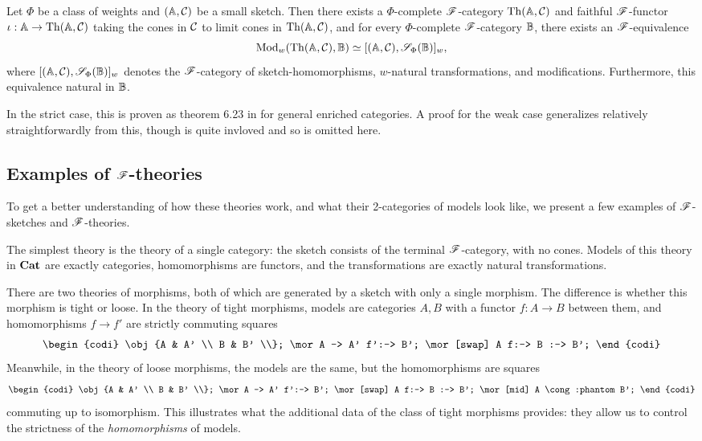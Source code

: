 \documentclass[../thesis.tex]{subfiles}
\begin{document}
\begin{theorem}
  Let $\Phi$ be a class of weights and $({\mathbb{A}},{\mathcal{C}})$ be a small sketch. Then there exists a $\Phi$-complete
  ${\mathscr{F}}$-category ${\mathrm{Th}}({\mathbb{A}},{\mathcal{C}})$ and faithful ${\mathscr{F}}$-functor $\iota : {\mathbb{A}} \to {\mathrm{Th}}({\mathbb{A}},{\mathcal{C}})$ taking the cones
  in ${\mathcal{C}}$ to limit cones in ${\mathrm{Th}}({\mathbb{A}},{\mathcal{C}})$, and for every $\Phi$-complete ${\mathscr{F}}$-category ${\mathbb{B}}$, there exists
  an ${\mathscr{F}}$-equivalence
  \[{\mathrm{Mod}}_w({\mathrm{Th}}({\mathbb{A}},{\mathcal{C}}),{\mathbb{B}}) \simeq [({\mathbb{A}},{\mathcal{C}}), {\mathscr{S}}_\Phi({\mathbb{B}})]_w,\]
  where $[({\mathbb{A}},{\mathcal{C}}), {\mathscr{S}}_\Phi({\mathbb{B}})]_w$ denotes the ${\mathscr{F}}$-category of sketch-homomorphisms, $w$-natural
  transformations, and modifications. Furthermore, this equivalence natural in ${\mathbb{B}}$.
\end{theorem}
\begin{remark}
  In the strict case, this is proven as theorem 6.23 in \cite{kelly1982a} for general enriched categories.
  A proof for the weak case generalizes relatively straightforwardly from this, though is quite invloved
  and so is omitted here.
\end{remark}


\subsection{Examples of \texorpdfstring{${\mathscr{F}}$}{F}-theories}
To get a better understanding of how these theories work, and what their 2-categories of models look like,
we present a few examples of ${\mathscr{F}}$-sketches and ${\mathscr{F}}$-theories.

\begin{example}
  The simplest theory is the theory of a single category: the sketch consists of the terminal
  ${\mathscr{F}}$-category, with no cones. Models of this theory in ${\mathbf{Cat}}$ are exactly categories,
  homomorphisms are functors, and the transformations are exactly natural transformations.
\end{example}

\begin{example}
  There are two theories of morphisms, both of which are generated by a sketch with only a single morphism.
  The difference is whether this morphism is tight or loose. In the theory of tight morphisms, models are
  categories $A,B$ with a functor $f : A \to B$ between them, and homomorphisms $f \to f'$ are strictly
  commuting squares
  \[\begin{codi}
    \obj {A & A' \\ B & B' \\};
    \mor A -> A' f':-> B';
    \mor[swap] A f:-> B :-> B';
  \end{codi}\]
  Meanwhile, in the theory of loose morphisms, the models are the same, but the homomorphisms are squares 
  \[\begin{codi}
    \obj {A & A' \\ B & B' \\};
    \mor A -> A' f':-> B';
    \mor[swap] A f:-> B :-> B';
    \mor[mid] A \cong:phantom B';
  \end{codi}\]
  commuting up to isomorphism. This illustrates what the additional data of the class of tight morphisms
  provides: they allow us to control the strictness of the \emph{homomorphisms} of models.
\end{example}
\end{document}

